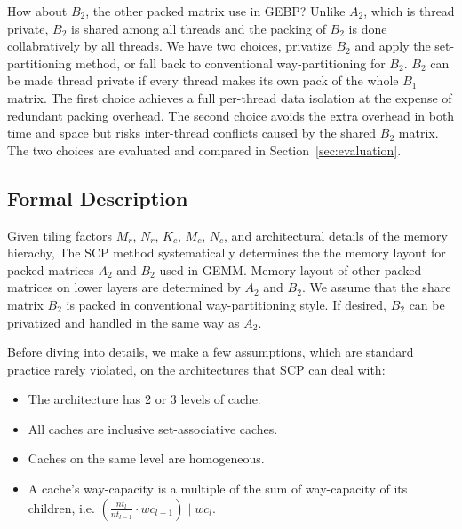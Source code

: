 How about $B_2$, the other packed matrix use in GEBP?
Unlike $A_2$, which is thread private,
$B_2$ is shared among all threads and
the packing of $B_2$ is done collabratively by all threads.
We have two choices, privatize $B_2$ and apply the set-partitioning method,
or fall back to conventional way-partitioning for $B_2$.
$B_2$ can be made thread private if every thread makes
its own pack of the whole $B_1$ matrix.
The first choice achieves a full per-thread data isolation
at the expense of redundant packing overhead.
The second choice avoids the extra overhead in both time and space
but risks inter-thread conflicts caused by the shared $B_2$ matrix.
The two choices are evaluated and compared in Section~\ref{sec:evaluation}.

\subsection{Formal Description}\label{subsec:formal}
Given tiling factors $M_r$, $N_r$, $K_c$, $M_c$, $N_c$,
and architectural details of the memory hierachy,
The SCP method systematically determines the
the memory layout for packed matrices $A_2$ and $B_2$ used in GEMM.
Memory layout of other packed matrices on lower layers are
determined by $A_2$ and $B_2$.
We assume that the share matrix $B_2$ is packed
in conventional way-partitioning style.
If desired, $B_2$ can be privatized and handled in the same way as $A_2$.

Before diving into details, we make a few assumptions,
which are standard practice rarely violated,
on the architectures that SCP can deal with:
\begin{itemize}
\item The architecture has 2 or 3 levels of cache. %
\item All caches are inclusive set-associative caches. %
\item Caches on the same level are homogeneous. %
\item A cache's way-capacity is a multiple of the sum of way-capacity of its children,
i.e. $(\frac{nt_l}{nt_{l-1}} \cdot wc_{l-1}) \mid wc_l$.
\end{itemize}

